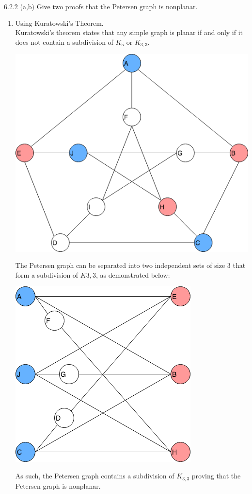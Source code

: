 \documentclass[12pt]{article}
\newenvironment{question}[2][Question]{\begin{trivlist}
\item[\hskip \labelsep {\bfseries #1}\hskip \labelsep {\bfseries #2.}]}{\end{trivlist}}
\begin{document}
\begin{question}{5} 
6.2.2 (a,b) Give two proofs that the Petersen graph is nonplanar.
\begin{enumerate}[label=\alph*)]
  \item Using Kuratowski's Theorem.   \\
  Kuratowski's theorem states that any simple graph is planar if and only if it does not contain a subdivision of $K_5$ or $K_{3,3}$.
  \begin{center}
    \includegraphics[scale=.45]{petersen}
  \end{center}
  The Petersen graph can be separated into two independent sets of size 3 that form a subdivision of $K{3,3}$, as demonstrated below:
  \begin{center}
    \includegraphics[scale=.45]{k33}
  \end{center}
  As such, the Petersen graph contains a subdivision of $K_{3,3}$ proving that the Petersen graph is nonplanar.


\end{enumerate}
\end{question}
\end{document}

